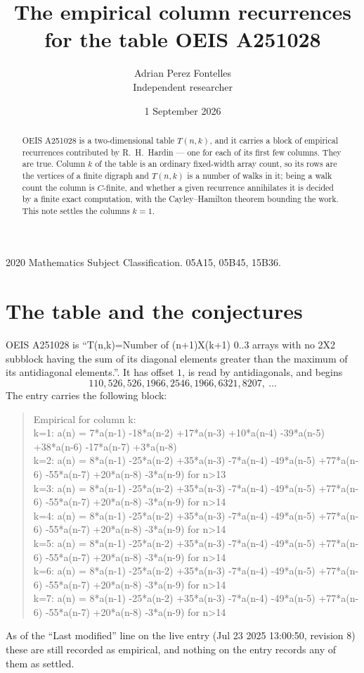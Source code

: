\documentclass[11pt,a4paper]{article}
\title{The empirical column recurrences for the table OEIS A251028}
\author{Adrian Perez Fontelles\\ \small Independent researcher}
\date{1 September 2026}
\theoremstyle{plain}
\theoremstyle{definition}
\begin{document}
\maketitle

\begin{abstract}
OEIS A251028 is a two-dimensional table $T(n,k)$, and it carries a block of empirical
recurrences contributed by R.~H.~Hardin --- one for each of its first few columns. They are
true. Column $k$ of the table is an ordinary fixed-width array count, so its rows are the
vertices of a finite digraph and $T(n,k)$ is a number of walks in it; being a walk count the
column is $C$-finite, and whether a given recurrence annihilates it is decided by a finite
exact computation, with the Cayley--Hamilton theorem bounding the work. This note settles the
columns $k=1$.
\end{abstract}

\noindent\small 2020 Mathematics Subject Classification. 05A15, 05B45, 15B36.\normalsize

\section{The table and the conjectures}

OEIS A251028 is ``T(n,k)=Number of (n+1)X(k+1) 0..3 arrays with no 2X2 subblock having the sum of its diagonal elements greater than the maximum of its antidiagonal elements.''. It has offset $1$, is
read by antidiagonals, and begins
\[
110, 526, 526, 1966, 2546, 1966, 6321, 8207,\ \dots
\]
The entry carries the following block:
\begin{quote}\small
Empirical for column k:\\
k=1: a(n) = 7*a(n-1) -18*a(n-2) +17*a(n-3) +10*a(n-4) -39*a(n-5) +38*a(n-6) -17*a(n-7) +3*a(n-8)\\
k=2: a(n) = 8*a(n-1) -25*a(n-2) +35*a(n-3) -7*a(n-4) -49*a(n-5) +77*a(n-6) -55*a(n-7) +20*a(n-8) -3*a(n-9) for n>13\\
k=3: a(n) = 8*a(n-1) -25*a(n-2) +35*a(n-3) -7*a(n-4) -49*a(n-5) +77*a(n-6) -55*a(n-7) +20*a(n-8) -3*a(n-9) for n>14\\
k=4: a(n) = 8*a(n-1) -25*a(n-2) +35*a(n-3) -7*a(n-4) -49*a(n-5) +77*a(n-6) -55*a(n-7) +20*a(n-8) -3*a(n-9) for n>14\\
k=5: a(n) = 8*a(n-1) -25*a(n-2) +35*a(n-3) -7*a(n-4) -49*a(n-5) +77*a(n-6) -55*a(n-7) +20*a(n-8) -3*a(n-9) for n>14\\
k=6: a(n) = 8*a(n-1) -25*a(n-2) +35*a(n-3) -7*a(n-4) -49*a(n-5) +77*a(n-6) -55*a(n-7) +20*a(n-8) -3*a(n-9) for n>14\\
k=7: a(n) = 8*a(n-1) -25*a(n-2) +35*a(n-3) -7*a(n-4) -49*a(n-5) +77*a(n-6) -55*a(n-7) +20*a(n-8) -3*a(n-9) for n>14\\
\end{quote}
As of the ``Last modified'' line on the live entry (Jul 23 2025 13:00:50, revision 8) these are still
recorded as empirical, and nothing on the entry records any of them as settled.
\end{document}
